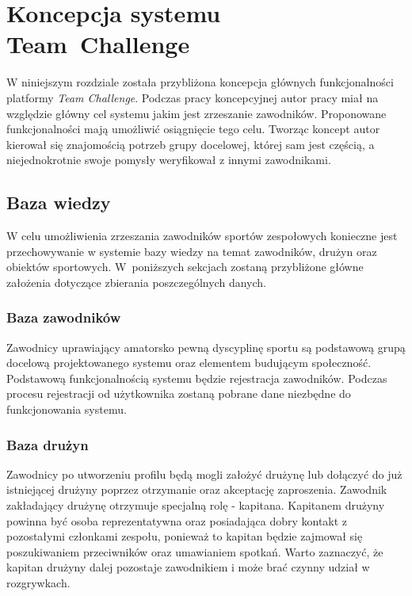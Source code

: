 \chapter{Koncepcja systemu Team~Challenge}

W niniejszym rozdziale została przybliżona koncepcja głównych funkcjonalności platformy \textit{Team Challenge}. Podczas pracy koncepcyjnej autor pracy miał na względzie główny cel systemu jakim jest zrzeszanie zawodników. Proponowane funkcjonalności mają umożliwić osiągnięcie tego celu. Tworząc koncept autor kierował się znajomością potrzeb grupy docelowej, której sam jest częścią, a niejednokrotnie swoje pomysły weryfikował z innymi zawodnikami.

  
\section{Baza wiedzy}

W celu umożliwienia zrzeszania zawodników sportów zespołowych konieczne jest przechowywanie w systemie bazy wiedzy na temat zawodników, drużyn oraz obiektów sportowych. W~poniższych sekcjach zostaną przybliżone główne założenia dotyczące zbierania poszczególnych danych.
  
\subsection{Baza zawodników}

Zawodnicy uprawiający amatorsko pewną dyscyplinę sportu są podstawową grupą docelową projektowanego systemu oraz elementem budującym społeczność. Podstawową funkcjonalnością systemu będzie rejestracja zawodników. Podczas procesu rejestracji od użytkownika zostaną pobrane dane niezbędne do funkcjonowania systemu.

\subsection{Baza drużyn}

Zawodnicy po utworzeniu profilu będą mogli założyć drużynę lub dołączyć do już istniejącej drużyny poprzez otrzymanie oraz akceptację zaproszenia. Zawodnik zakładający drużynę otrzymuje specjalną rolę - kapitana. Kapitanem drużyny powinna być osoba reprezentatywna oraz posiadająca dobry kontakt z pozostałymi członkami zespołu, ponieważ to kapitan będzie zajmował się poszukiwaniem przeciwników oraz umawianiem spotkań. Warto zaznaczyć, że kapitan drużyny dalej pozostaje zawodnikiem i może brać czynny udział w rozgrywkach. 

